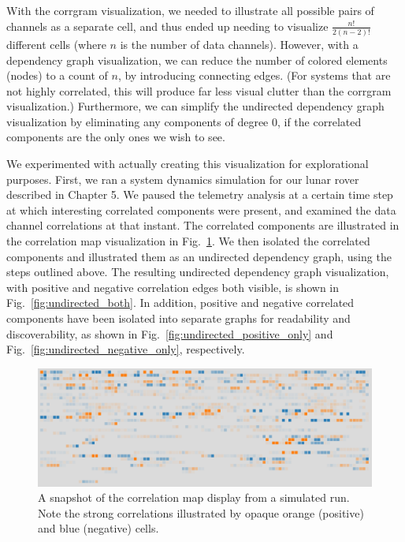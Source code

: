 With the corrgram visualization, we needed to illustrate all possible pairs of channels as a separate cell, and thus ended up needing to visualize $\frac{n!}{2 (n - 2)!}$ different cells (where $n$ is the number of data channels). However, with a dependency graph visualization, we can reduce the number of colored elements (nodes) to a count of $n$, by introducing connecting edges. (For systems that are not highly correlated, this will produce far less visual clutter than the corrgram visualization.) Furthermore, we can simplify the undirected dependency graph visualization by eliminating any components of degree 0, if the correlated components are the only ones we wish to see.

We experimented with actually creating this visualization for explorational purposes. First, we ran a system dynamics simulation for our lunar rover described in Chapter 5. We paused the telemetry analysis at a certain time step at which interesting correlated components were present, and examined the data channel correlations at that instant. The correlated components are illustrated in the correlation map visualization in Fig.~\ref{fig:comparison_correlation_map}. We then isolated the correlated components and illustrated them as an undirected dependency graph, using the steps outlined above. The resulting undirected dependency graph visualization, with positive and negative correlation edges both visible, is shown in Fig.~\ref{fig:undirected_both}. In addition, positive and negative correlated components have been isolated into separate graphs for readability and discoverability, as shown in Fig.~\ref{fig:undirected_positive_only} and Fig.~\ref{fig:undirected_negative_only}, respectively.

\begin{figure}[h]
\centering
    \includegraphics[width=\columnwidth]{images/comparison_correlation_map.png}
    \caption{A snapshot of the correlation map display from a simulated run. Note the strong correlations illustrated by opaque orange (positive) and blue (negative) cells.}
    \label{fig:comparison_correlation_map}
\end{figure}

